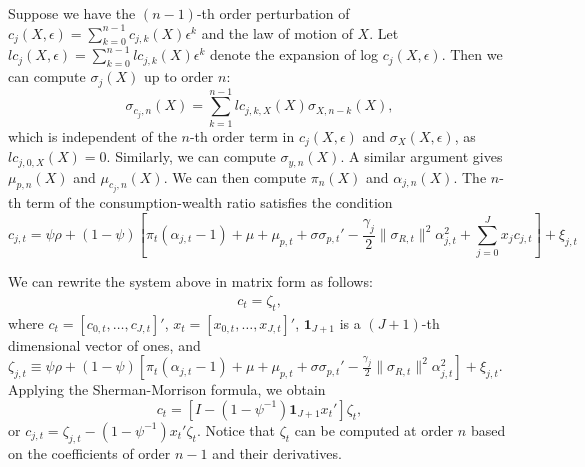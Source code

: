Suppose we have the $(n-1)$-th order perturbation of $c_{j}(X,\epsilon) = \sum_{k=0}^{n-1}c_{j,k}(X) \epsilon^k$ and the law of motion of $X$. 
Let $lc_{j}(X,\epsilon) = \sum_{k=0}^{n-1} lc_{j,k}(X) \epsilon^k$ denote the expansion of log $c_j(X,\epsilon)$.
Then we can compute $\sigma_{j}(X)$ up to order $n$:
\begin{equation}
    \sigma_{c_j,n}(X) = \sum_{k=1}^{n-1} lc_{j,k,X}(X) \sigma_{X,n-k}(X),
\end{equation}
which is independent of the $n$-th order term in $c_{j}(X,\epsilon)$ and $\sigma_X(X,\epsilon)$, as $lc_{j,0,X}(X) = 0$. Similarly, we can compute $\sigma_{y,n}(X)$. A similar argument gives $\mu_{p,n}(X)$ and $\mu_{c_j,n}(X)$. We can then compute $\pi_n(X)$ and $\alpha_{j,n}(X)$. The $n$-th term of the consumption-wealth ratio satisfies the condition
\begin{equation}
c_{j,t} = \psi \rho + (1-\psi) \left[ \pi_t (\alpha_{j,t}-1) + \mu + \mu_{p,t} + \sigma \sigma_{p,t}' - \frac{\gamma_j}{2} \|\sigma_{R,t}\|^2 \alpha_{j,t}^2 + \sum_{j=0}^J x_j c_{j,t} \right] + \xi_{j,t}
\end{equation}

We can rewrite the system above in matrix form as follows:
\begin{align}
    [ I - (1-\psi) \textbf{1}_{J+1} x_t'] c_t = \zeta_t,
\end{align}
where $c_t = [c_{0,t},\ldots, c_{J,t}]'$, $x_t=[x_{0,t},\ldots ,x_{J,t}]'$, $\textbf{1}_{J+1}$ is a $(J+1)$-th dimensional vector of ones, and
$\zeta_{j,t} \equiv \psi \rho + (1-\psi) \left[ \pi_t (\alpha_{j,t}-1) + \mu + \mu_{p,t} + \sigma \sigma_{p,t}' - \frac{\gamma_j}{2} \|\sigma_{R,t}\|^2 \alpha_{j,t}^2 \right] + \xi_{j,t}$. Applying the Sherman-Morrison formula, we obtain
\begin{equation}
    c_t = [I - (1-\psi^{-1}) \textbf{1}_{J+1} x_t'] \zeta_t,
\end{equation}
or $c_{j,t} = \zeta_{j,t} - (1-\psi^{-1}) x_t' \zeta_t$. Notice that $\zeta_t$ can be computed at order $n$ based on the coefficients of order $n-1$ and their derivatives.

